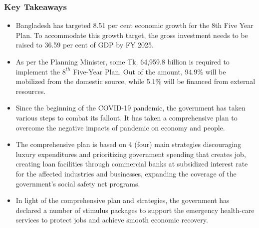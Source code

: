 \subsubsection{Key Takeaways}
\begin{itemize}
	\item Bangladesh has targeted 8.51 per cent economic growth for the 8th Five Year Plan. 
	To accommodate this growth target, the gross investment needs to be raised to 36.59 per cent 
	of GDP by FY 2025.
	
	\item As per the Planning Minister, some Tk. 64,959.8 billion is required to implement 
	the $8^{th}$ Five-Year Plan. Out of the amount, 94.9\% will be mobilized from the domestic source, 
	while 5.1\% will be financed from external resources.
	
	\item Since the beginning of the COVID-19 pandemic, the government has taken various steps to combat its fallout. 
	It has taken a comprehensive plan to overcome the negative impacts of pandemic on economy and people.
	
	\item The comprehensive plan is based on 4 (four) main strategies discouraging luxury expenditures and 
	prioritizing government spending that creates job, creating loan facilities through commercial banks at 
	subsidized interest rate for the affected industries and businesses, expanding the coverage of 
	the government's social safety net programs.
	
	\item In light of the comprehensive plan and strategies, the government has declared 
	a number of stimulus packages to support the emergency health-care services to protect 
	jobs and achieve smooth economic recovery.
\end{itemize}



